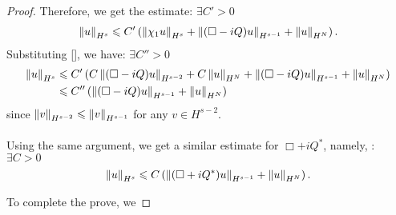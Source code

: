 \documentclass[12pt]{article}
\begin{document}
\begin{proof}
     Therefore, we get the estimate: $\exists C' > 0$
     \begin{align*}
     \norm[u]_{H^s} \leq C' \brac{\norm[\chi_1 u]_{H^s} +  \norm[(\Box - iQ) u]_{H^{s - 1}} + \norm[u]_{H^N} }. 
     \end{align*}
     Substituting \ref{}, we have: $\exists C''> 0$
     \begin{align*}
      \norm[u]_{H^s} 
      & \leq C' \brac{C \norm[(\Box - iQ)u ]_{H^{s - 2}} + C \norm[u]_{H^N} +  \norm[(\Box - iQ) u]_{H^{s - 1}} + \norm[u]_{H^N} } \\
      & \leq C'' \brac{ \norm[(\Box - iQ) u]_{H^{s - 1}} + \norm[u]_{H^N} }
     \end{align*}
     since $\norm[v]_{H^{s - 2}} \leq \norm[v]_{H^{s - 1}}$ for any $v \in H^{s - 2}$. \\
     \\
     Using the same argument,  we get a similar estimate for $\Box + i Q^*$, namely,  : $\exists C > 0$
     \begin{align*}
     \norm[u]_{H^s} \leq C \brac{ \norm[(\Box + i Q^*)u]_{H^{s - 1}} + \norm[u]_{H^N}}. 
     \end{align*}
     
     To complete the prove, we 

\end{proof}
\end{document}
